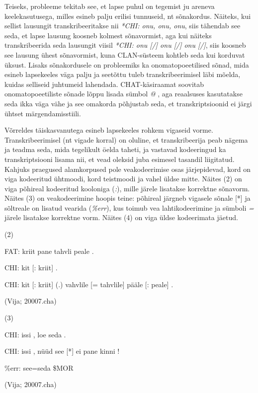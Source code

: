 \documentclass[12pt]{article}
\begin{document}
Teiseks, probleeme tekitab see, et lapse puhul on tegemist ju areneva keelekasutusega, milles esineb palju erilisi tunnuseid, nt sõnakordus. Näiteks, kui sellist lausungit transkribeeritakse nii \emph{*CHI: onu, onu, onu}, siis tähendab see seda, et lapse lausung koosneb kolmest sõnavormist, aga kui näiteks transkribeerida seda lausungit viisil \emph{*CHI: onu [/] onu [/] onu [/]}, siis koosneb see lausung ühest sõnavormist, kuna CLAN-süsteem kohtleb seda kui korduvat üksust. Lisaks sõnakordusele on probleemiks ka onomatopoeetilised sõnad, mida esineb lapsekeeles väga palju ja seetõttu tuleb transkribeerimisel läbi mõelda, kuidas selliseid juhtumeid lahendada. CHAT-käsiraamat soovitab onomatopoeetiliste sõnade lõppu lisada sümbol \emph{@} \citep[72--73]{Argus2007}, aga reaalsuses kasutatakse seda ikka väga vähe ja see omakorda põhjustab seda, et transkriptsioonid ei järgi ühtset märgendamisstiili.

Võrreldes täiskasvanutega esineb lapsekeeles rohkem vigaseid vorme. Transkribeerimisel (nt vigade korral) on oluline, et transkribeerija peab nägema ja teadma seda, mida tegelikult öelda taheti, ja vastavad kodeeringud ka transkriptsiooni lisama nii, et vead oleksid juba esimesel tasandil liigitatud. \citep[74]{Argus2007} Kahjuks praegused alamkorpused pole veakodeerimise osas järjepidevad, kord on viga kodeeritud ühtmoodi, kord teistmoodi ja vahel üldse mitte. Näites (2) on viga põhireal kodeeritud kooloniga (\emph{:}), mille järele lisatakse korrektne sõnavorm. Näites (3) on veakodeerimine hoopis teine: põhireal järgneb vigasele sõnale [*] ja sõltreale on lisatud vearida (\emph{\%err}), kus  toimub vea lahtikodeerimine ja sümboli \emph{=} järele lisatakse korrektne vorm. Näites (4) on viga üldse kodeerimata jäetud.\\
\hfill

(2)
\begin{description}
    \item*FAT: kriit pane tahvli peale .
    \item*CHI: kit [: kriit] .
    \item*CHI: kit [: kriit] (.) vahvlile [= tahvlile] pääle [: peale] .
    \item(Vija; 20007.cha)
\end{description}
\hfill

(3)
\begin{description}
    \item*CHI: issi , loe seda .
    \item*CHI: issi , nüüd see [*] ei pane kinni !
    \item\%err: see=seda \$MOR
    \item(Vija; 20007.cha)
\end{description}
\hfill
\end{document}
